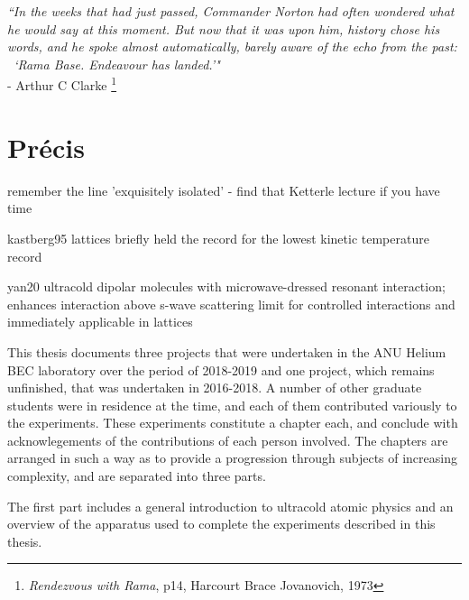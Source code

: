 


\begin{adjustwidth}{3.5cm}{0cm}
\begin{flushright}
{\emph{``In the weeks that had just passed, Commander Norton had often wondered what he would say at this moment. But now that it was upon him, history chose his words, and he spoke almost automatically, barely aware of the echo from the past:\\ ~`Rama Base. \emph{Endeavour} has landed.'"\\} 
- Arthur C Clarke \footnote{\emph{Rendezvous with Rama}, p14, Harcourt Brace Jovanovich, 1973}}
\end{flushright}
\end{adjustwidth}

\section*{Pr\'{e}cis}\label{sec:abstract}

remember the line 'exquisitely isolated' - find that Ketterle lecture if you have time

kastberg95
		lattices briefly held the record for the lowest kinetic temperature record

yan20 ultracold dipolar molecules with microwave-dressed resonant interaction; enhances interaction above s-wave scattering limit for controlled interactions and immediately applicable in lattices

This thesis documents three projects that were undertaken in the ANU
Helium BEC laboratory over the period of 2018-2019 and one project,
which remains unfinished, that was undertaken in 2016-2018. A number of
other graduate students were in residence at the time, and each of them
contributed variously to the experiments. These experiments constitute a
chapter each, and conclude with acknowlegements of the contributions of
each person involved. The chapters are arranged in such a way as to
provide a progression through subjects of increasing complexity, and are
separated into three parts.

The first part includes a general introduction to ultracold atomic
physics and an overview of the apparatus used to complete the
experiments described in this thesis.

